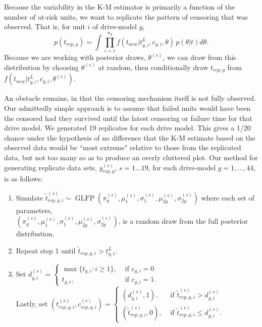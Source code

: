\documentclass[12pt]{article}
\newcommand{\op}{\operatorname}
\begin{document}
Because the variability in the K-M estimator is primarily a function of the number of at-risk units, we want to replicate the pattern of censoring that was observed. That is, for unit $i$ of drive-model $g$,
$$p(t_{rep,g}) = \int \prod_{i=1}^{n_g}f(t_{new}|t_{g,i}^L,c_{g,i},\theta)\,p(\theta|t)d\theta.$$
Because we are working with posterior draws, $\theta^{(s)}$, we can draw from this distribution by choosing $\theta^{(s)}$ at random, then conditionally draw $t_{rep,g}$ from $f(t_{new}|t_{g,i}^L,c_{g,i},\theta^{(s)}).$

An obstacle remains, in that the censoring mechanism itself is not fully observed. Our admittedly simple approach is to assume that failed units would have been the censored had they survived until the latest censoring or failure time for that drive model. We generated 19 replicates for each drive model. This gives a 1/20 chance under the hypothesis of no difference that the K-M estimate based on the observed data would be ``most extreme" relative to those from the replicated data, but not too many so as to produce an overly cluttered plot. Our method for generating replicate data sets, $y_{rep,g}^{(s)}$, $s = 1 \dots 19$, for each drive-model $g=1,\ldots,44$, is as follows:
\begin{enumerate}
\item Simulate $\tilde{t}_{rep,g,i}^{(s)} \sim \op{GLFP}(\pi_{g}^{(s)},\mu_1^{(s)},\sigma_1^{(s)},\mu_{2g}^{(s)}, \sigma_{2g}^{(s)})$ where each set of parameters, \\$\left( \pi_{g}^{(s)},\mu_1^{(s)},\sigma_1^{(s)},\mu_{2g}^{(s)}, \sigma_{2g}^{(s)} \right)$, is a random draw from the full posterior distribution.
\item Repeat step 1 until $\tilde{t}_{rep,g,i} > t_{g,i}^L$.
\item Set $d_{g,i}^{(s)}= \begin{cases} \max \{t_{g,i}: i \ge 1\}, & \mbox{ if }c_{g,i}=0\\
t_{g,i}, & \mbox{ if }c_{g, i}=1. \end{cases}$\\
Lastly, set $(t_{rep,g,i}^{(s)},c_{rep,g,i}^{(s)}) = \begin{cases}
  (d_{g,i}^{(s)},1), & \mbox{ if } \tilde{t}_{rep,g,i}^{(s)}>d_{g,i}^{(s)}\\
  (\tilde{t}_{rep,g,i}^{(s)},0), & \mbox{ if }\tilde{t}_{rep,g,i}^{(s)} \le d_{g,i}^{(s)}.
\end{cases}$
\end{enumerate}
\end{document}
